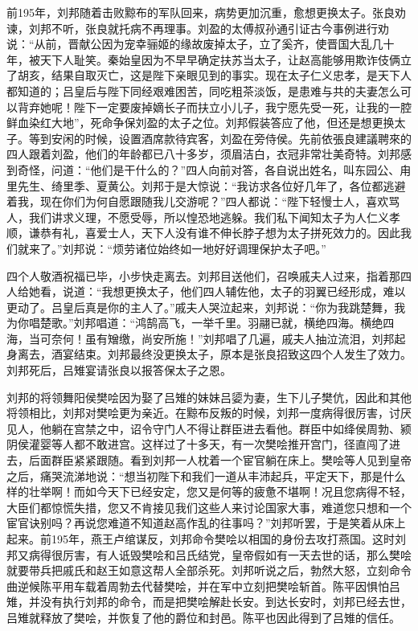 前195年，刘邦随着击败黥布的军队回来，病势更加沉重，愈想更换太子。张良劝谏，刘邦不听，张良就托病不再理事。刘盈的太傅叔孙通引证古今事例进行劝说：“从前，晋献公因为宠幸骊姬的缘故废掉太子，立了奚齐，使晋国大乱几十年，被天下人耻笑。秦始皇因为不早早确定扶苏当太子，让赵高能够用欺诈伎俩立了胡亥，结果自取灭亡，这是陛下亲眼见到的事实。现在太子仁义忠孝，是天下人都知道的；吕皇后与陛下同经艰难困苦，同吃粗茶淡饭，是患难与共的夫妻怎么可以背弃她呢！陛下一定要废掉嫡长子而扶立小儿子，我宁愿先受一死，让我的一腔鲜血染红大地”，死命争保刘盈的太子之位。刘邦假装答应了他，但还是想更换太子。等到安闲的时候，设置酒席款待宾客，刘盈在旁侍侯。先前依張良建議聘來的四人跟着刘盈，他们的年龄都已八十多岁，须眉洁白，衣冠非常壮美奇特。刘邦感到奇怪，问道：“他们是干什么的？”四人向前对答，各自说出姓名，叫东园公、甪里先生、绮里季、夏黄公。刘邦于是大惊说：“我访求各位好几年了，各位都逃避着我，现在你们为何自愿跟随我儿交游呢？”四人都说：“陛下轻慢士人，喜欢骂人，我们讲求义理，不愿受辱，所以惶恐地逃躲。我们私下闻知太子为人仁义孝顺，谦恭有礼，喜爱士人，天下人没有谁不伸长脖子想为太子拼死效力的。因此我们就来了。”刘邦说：“烦劳诸位始终如一地好好调理保护太子吧。” 

四个人敬酒祝福已毕，小步快走离去。刘邦目送他们，召唤戚夫人过来，指着那四人给她看，说道：“我想更换太子，他们四人辅佐他，太子的羽翼已经形成，难以更动了。吕皇后真是你的主人了。”戚夫人哭泣起来，刘邦说：“你为我跳楚舞，我为你唱楚歌。”刘邦唱道：“鸿鹄高飞，一举千里。羽翮已就，横绝四海。横绝四海，当可奈何！虽有矰缴，尚安所施！”刘邦唱了几遍，戚夫人抽泣流泪，刘邦起身离去，酒宴结束。刘邦最终没更换太子，原本是张良招致这四个人发生了效力。刘邦死后，吕雉宴请张良以报答保太子之恩。

刘邦的将领舞阳侯樊哙因为娶了吕雉的妹妹吕媭为妻，生下儿子樊伉，因此和其他将领相比，刘邦对樊哙更为亲近。在黥布反叛的时候，刘邦一度病得很厉害，讨厌见人，他躺在宫禁之中，诏令守门人不得让群臣进去看他。群臣中如绛侯周勃、颍阴侯灌婴等人都不敢进宫。这样过了十多天，有一次樊哙推开宫门，径直闯了进去，后面群臣紧紧跟随。看到刘邦一人枕着一个宦官躺在床上。樊哙等人见到皇帝之后，痛哭流涕地说：“想当初陛下和我们一道从丰沛起兵，平定天下，那是什么样的壮举啊！而如今天下已经安定，您又是何等的疲惫不堪啊！况且您病得不轻，大臣们都惊慌失措，您又不肯接见我们这些人来讨论国家大事，难道您只想和一个宦官诀别吗？再说您难道不知道赵高作乱的往事吗？”刘邦听罢，于是笑着从床上起来。前195年，燕王卢绾谋反，刘邦命令樊哙以相国的身份去攻打燕国。这时刘邦又病得很厉害，有人诋毁樊哙和吕氏结党，皇帝假如有一天去世的话，那么樊哙就要带兵把戚氏和赵王如意这帮人全部杀死。刘邦听说之后，勃然大怒，立刻命令曲逆候陈平用车载着周勃去代替樊哙，并在军中立刻把樊哙斩首。陈平因惧怕吕雉，并没有执行刘邦的命令，而是把樊哙解赴长安。到达长安时，刘邦已经去世，吕雉就释放了樊哙，并恢复了他的爵位和封邑。陈平也因此得到了吕雉的信任。

